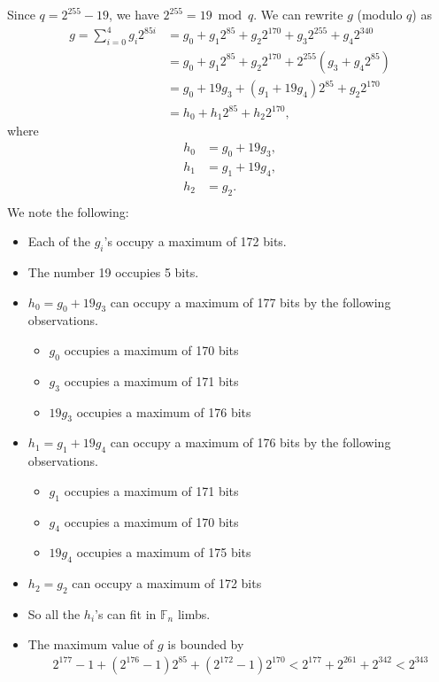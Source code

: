 \documentclass[a4paper, 12pt]{article}
\begin{document}
Since $q = 2^{255}-19$, we have $2^{255} = 19 \bmod q$. We can rewrite $g$ (modulo $q$) as
\begin{align*}
  g  = \sum^{4}_{i=0} g_i 2^{85i} &= g_0 + g_1 2^{85} + g_2 2^{170} + g_3 2^{255} + g_4 2^{340}\\
                                  & = g_0 + g_1 2^{85} + g_2 2^{170} + 2^{255}\left( g_3 + g_4 2^{85} \right) \\
                                  & = g_0 + 19 g_3 + (g_1 + 19 g_4) 2^{85} + g_2 2^{170}\\
                                  & = h_0 + h_1 2^{85} + h_2 2^{170},
\end{align*}
where
\begin{align*}
  h_0 & = g_0 + 19 g_3,\\
  h_1 & = g_1 + 19 g_4,\\
  h_2 & = g_2.\\
\end{align*}
We note the following:
\begin{itemize}
  \item Each of the $g_i$'s occupy a maximum of 172 bits.
  \item The number 19 occupies 5 bits.
  \item $h_0 = g_0 + 19 g_3$ can occupy a maximum of 177 bits by the following observations.
    \begin{itemize}
      \item $g_0$ occupies a maximum of 170 bits
      \item $g_3$ occupies a maximum of 171 bits
      \item $19g_3$ occupies a maximum of 176 bits
    \end{itemize}
  \item $h_1 = g_1 + 19 g_4$ can occupy a maximum of 176 bits by the following observations.
    \begin{itemize}
      \item $g_1$ occupies a maximum of 171 bits
      \item $g_4$ occupies a maximum of 170 bits
      \item $19g_4$ occupies a maximum of 175 bits
    \end{itemize}
  \item $h_2 = g_2$ can occupy a maximum of 172 bits
  \item So all the $h_i$'s can fit in $\mathbb{F}_n$ limbs.
  \item The maximum value of $g$ is bounded by
    \begin{align*}
      2^{177} - 1 + \left(2^{176} - 1\right) 2^{85}+ \left( 2^{172}-1 \right)2^{170}< 2^{177} + 2^{261} + 2^{342} < 2^{343}
    \end{align*}
\end{itemize}
\end{document}
